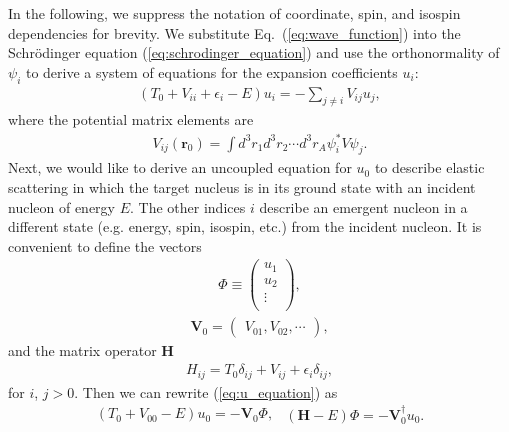 \documentclass[preprintnumbers,floatfix,aps,prc,preprint,nofootinbib]{revtex4-1}
\begin{document}
In the following, we suppress the notation of coordinate, spin, and isospin dependencies for brevity. We substitute Eq.~(\ref{eq:wave_function}) into the Schr\"odinger equation (\ref{eq:schrodinger_equation}) and use the orthonormality of $\psi_i$ to derive a system of equations for the expansion coefficients $u_i$:
%
\begin{eqnarray}
	\label{eq:u_equation}
	(T_0 + V_{ii} + \epsilon_i - E) u_i = - \sum_{j \neq i} V_{ij} u_j,
\end{eqnarray}
%
where the potential matrix elements are
%
\begin{eqnarray}
	\label{eq:potential_matrix_elements}
	V_{ij}(\textbf{r}_0) = \int{d^3 r_1 d^3 r_2 \cdots d^3 r_A \psi_i^* V \psi_j}.
\end{eqnarray}
%
Next, we would like to derive an uncoupled equation for $u_0$ to describe elastic scattering in which the target nucleus is in its ground state with an incident nucleon of energy $E$. The other indices $i$ describe an emergent nucleon in a different state (e.g. energy, spin, isospin, etc.) from the incident nucleon. It is convenient to define the vectors
%
\begin{eqnarray}
	\label{eq:u_vector}
	\Phi \equiv
	\begin{pmatrix}
		u_1 \\
		u_2 \\
		\vdots \\
	\end{pmatrix}
	,
\end{eqnarray}
%
\begin{eqnarray}
	\label{eq:potential_vector}
	\textbf{V}_0 =
	\begin{pmatrix}
		V_{01}, V_{02}, \cdots
	\end{pmatrix}
	,
\end{eqnarray}
%
and the matrix operator $\textbf{H}$
%
\begin{eqnarray}
	\label{eq:hamiltonian_operator}
	H_{ij} = T_0 \delta_{ij} + V_{ij} + \epsilon_i \delta_{ij},
\end{eqnarray}
%
for $i$, $j > 0$. Then we can rewrite (\ref{eq:u_equation}) as
%
\begin{subequations}
	\label{eq:u_vector_equation}
	\begin{eqnarray}
		\label{eq:u_vector_equation_a}
		(T_0 + V_{00} - E) u_0 = -\textbf{V}_0 \Phi,
	\end{eqnarray}
	\begin{eqnarray}
		\label{eq:u_vector_equation_b}
		(\textbf{H}-E) \Phi = -\textbf{V}_0^{\dagger} u_0.
	\end{eqnarray}
\end{subequations}
\end{document}
